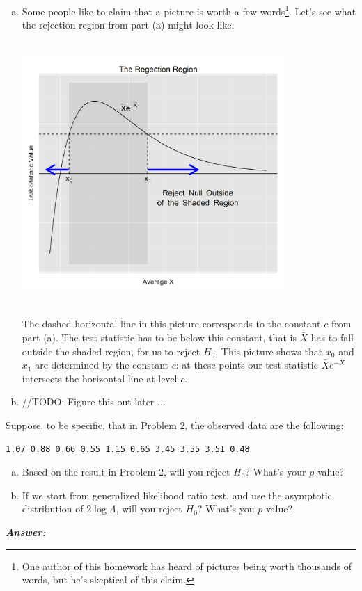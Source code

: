 \documentclass[12pt]{article}
\newenvironment{question}[2][Question]{\begin{trivlist}
\item[\hskip \labelsep {\bfseries #1}\hskip \labelsep {\bfseries #2.}]}{\end{trivlist}}
\begin{document}
\begin{enumerate}[(a)]
\item
Some people like to claim that a picture is worth a few words\footnote{One author of this homework has heard of pictures being worth thousands of words, but he's skeptical of this claim.}. Let's see what the rejection region from part (a) might look like:

\begin{center}
\includegraphics[width=10cm, height=10cm]{rejection_region_plot}
\end{center} 

The dashed horizontal line in this picture corresponds to the constant $c$ from part (a). The test statistic has to be below this constant, that is $\bar X$ has to fall outside the shaded region, for us to reject $H_0$. This picture shows that $x_0$ and $x_1$ are determined by the constant $c$: at these points our test statistic $\bar X \mathrm{e}^{-\bar X}$ intersects the horizontal line at level $c$.
\bigskip
\item //TODO: Figure this out later ...
\end{enumerate}

\bigskip
\bigskip
 \begin{question}{6.3}Suppose, to be specific, that in Problem 2, the observed data are the following:
\begin{verbatim}
1.07 0.88 0.66 0.55 1.15 0.65 3.45 3.55 3.51 0.48
\end{verbatim}

\begin{enumerate}[(a)]
\item Based on the result in Problem 2, will you reject $H_0$? What's your $p$-value?
\item If we start from generalized likelihood ratio test, and use the asymptotic distribution of $2 \log \Lambda$, will you reject $H_0$? What's you $p$-value?
\end{enumerate}

\end{question} 


  \textbf{\color{TealBlue}\emph{Answer:} } 
 
\end{document}
